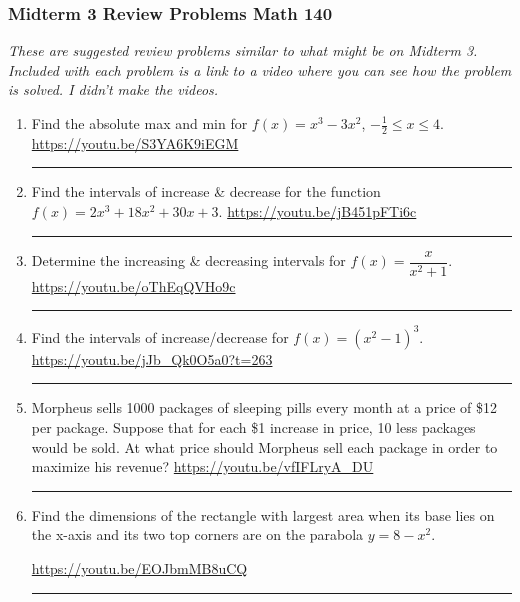\documentclass[12pt]{article}
\begin{document}
\pagestyle{empty}
\subsubsection*{Midterm 3 Review Problems \hfill Math 140 }
\textit{These are suggested review problems similar to what might be on Midterm 3. Included with each problem is a link to a video where you can see how the problem is solved. I didn't make the videos.}

\begin{enumerate}


\item Find the absolute max and min for $f(x) = x^3 - 3x^2$, $-\frac{1}{2} \le x \le 4$. 
\vfill 
\hfill  \url{https://youtu.be/S3YA6K9iEGM}
\hrule 

\item Find the intervals of increase \& decrease for the function $f(x) = 2x^3+18x^2+30x+3$.
\vfill
\hfill \url{https://youtu.be/jB451pFTi6c}
\hrule

\item Determine the increasing \& decreasing intervals for $f(x) = \dfrac{x}{x^2+1}$.  
\vfill
\hfill \url{https://youtu.be/oThEqQVHo9c}
\hrule

\item Find the intervals of increase/decrease for $f(x) = (x^2-1)^3$.
\vfill
\hfill \url{https://youtu.be/jJb_Qk0O5a0?t=263}
\hrule


\item Morpheus sells 1000 packages of sleeping pills every month at a price of \$12 per package. Suppose that for each \$1 increase in price, 10 less packages would be sold. At what price should Morpheus sell each package in order to maximize his revenue?
\vfill
\hfill \url{https://youtu.be/vfIFLryA_DU}
\hrule


\newpage
\item Find the dimensions of the rectangle with largest area when its base lies on the x-axis and its two top corners are on the parabola $y = 8 - x^2$. 
\begin{flushright}
\end{flushright}
\hfill \url{https://youtu.be/EOJbmMB8uCQ}
\hrule



\end{enumerate}
\end{document}
